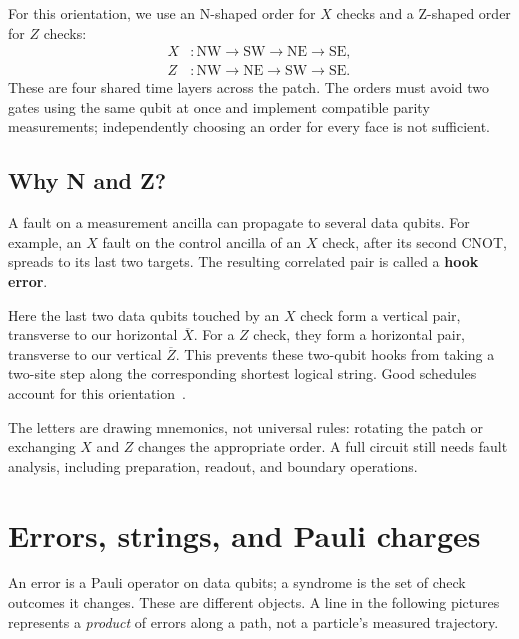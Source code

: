 \documentclass[11pt,a4paper]{article}
\newcommand{\XL}{\overline{X}}
\newcommand{\ZL}{\overline{Z}}
\begin{document}
For this orientation, we use an N-shaped order for $X$ checks and a Z-shaped order for $Z$ checks:
\[
\begin{aligned}
X &: \mathrm{NW}\to\mathrm{SW}\to\mathrm{NE}\to\mathrm{SE},\\
Z &: \mathrm{NW}\to\mathrm{NE}\to\mathrm{SW}\to\mathrm{SE}.
\end{aligned}
\]
These are four shared time layers across the patch. The orders must avoid two gates using the same qubit at once and implement compatible parity measurements; independently choosing an order for every face is not sufficient.

\subsection*{Why N and Z?}
A fault on a measurement ancilla can propagate to several data qubits. For example, an $X$ fault on the control ancilla of an $X$ check, after its second CNOT, spreads to its last two targets. The resulting correlated pair is called a \textbf{hook error}.

Here the last two data qubits touched by an $X$ check form a vertical pair, transverse to our horizontal $\XL$. For a $Z$ check, they form a horizontal pair, transverse to our vertical $\ZL$. This prevents these two-qubit hooks from taking a two-site step along the corresponding shortest logical string. Good schedules account for this orientation~\cite{cudaq}.

The letters are drawing mnemonics, not universal rules: rotating the patch or exchanging $X$ and $Z$ changes the appropriate order. A full circuit still needs fault analysis, including preparation, readout, and boundary operations.

\newpage
\section{Errors, strings, and Pauli charges}

An error is a Pauli operator on data qubits; a syndrome is the set of check outcomes it changes. These are different objects. A line in the following pictures represents a \emph{product} of errors along a path, not a particle's measured trajectory.

\begin{center}
\errorpatch
{}
\end{center}
\end{document}
